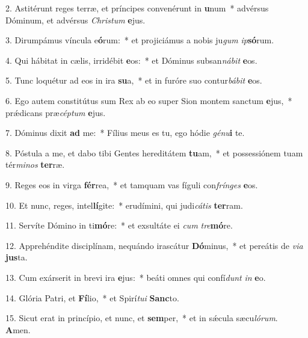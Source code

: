 2. Astitérunt reges terræ, et príncipes convenérunt in \textbf{u}num~*  advérsus Dóminum, et advérsus \textit{Chris}\textit{tum} \textbf{e}jus.\

3. Dirumpámus víncula e\textbf{ó}rum:~*  et projiciámus a nobis ju\textit{gum} \textit{ip}\textbf{só}rum.\

4. Qui hábitat in cælis, irridébit \textbf{e}os:~*  et Dóminus subsan\textit{ná}\textit{bit} \textbf{e}os.\

5. Tunc loquétur ad eos in ira \textbf{su}a,~*  et in furóre suo contur\textit{bá}\textit{bit} \textbf{e}os.\

6. Ego autem constitútus sum Rex ab eo super Sion montem sanctum \textbf{e}jus,~*  prǽdicans præ\textit{cép}\textit{tum} \textbf{e}jus.\

7. Dóminus dixit \textbf{ad} me:~*  Fílius meus es tu, ego hódie \textit{gé}\textit{nu}\textbf{i} te.\

8. Póstula a me, et dabo tibi Gentes hereditátem \textbf{tu}am,~*  et possessiónem tuam tér\textit{mi}\textit{nos} \textbf{ter}ræ.\

9. Reges eos in virga \textbf{fér}rea,~*  et tamquam vas fíguli con\textit{frín}\textit{ges} \textbf{e}os.\

10. Et nunc, reges, intel\textbf{lí}gite:~*  erudímini, qui judi\textit{cá}\textit{tis} \textbf{ter}ram.\

11. Servíte Dómino in ti\textbf{mó}re:~*  et exsultáte ei \textit{cum} \textit{tre}\textbf{mó}re.\

12. Apprehéndite disciplínam, nequándo irascátur \textbf{Dó}minus,~*  et pereátis de \textit{vi}\textit{a} \textbf{jus}ta.\

13. Cum exárserit in brevi ira \textbf{e}jus:~*  beáti omnes qui confí\textit{dunt} \textit{in} \textbf{e}o.\

14. Glória Patri, et \textbf{Fí}lio,~*  et Spirí\textit{tu}\textit{i} \textbf{Sanc}to.\

15. Sicut erat in princípio, et nunc, et \textbf{sem}per,~*  et in sǽcula sæcu\textit{ló}\textit{rum}. \textbf{A}men.\

